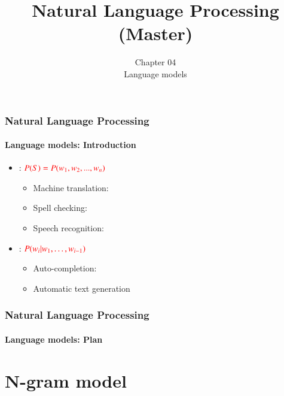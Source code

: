 \documentclass[xcolor=table]{beamer}
\title[ESI - NLP(master)]%
{Natural Language Processing (Master)}
\subtitle[04- Language models]%
{Chapter 04\\Language models}
\begin{document}
	
\begin{frame}
\frametitle{Natural Language Processing}
\framesubtitle{Language models: Introduction}

\begin{itemize}
	\item {}: $\color{red} P(S) = P(w_1, w_2, ..., w_n) $
	\begin{itemize}
		\item Machine translation: \\
		\item Spell checking: \\
		\item Speech recognition: \\
	\end{itemize}
	\item {}: $\color{red} P(w_i | w_1, \ldots, w_{i-1}) $
	\begin{itemize}
		\item Auto-completion: \\
		\item Automatic text generation
	\end{itemize}
\end{itemize}

\end{frame}


\begin{frame}
\frametitle{Natural Language Processing}
\framesubtitle{Language models: Plan}

\begin{multicols}{2}
\tableofcontents
\end{multicols}
\end{frame}

\section{N-gram model}
\end{document}

